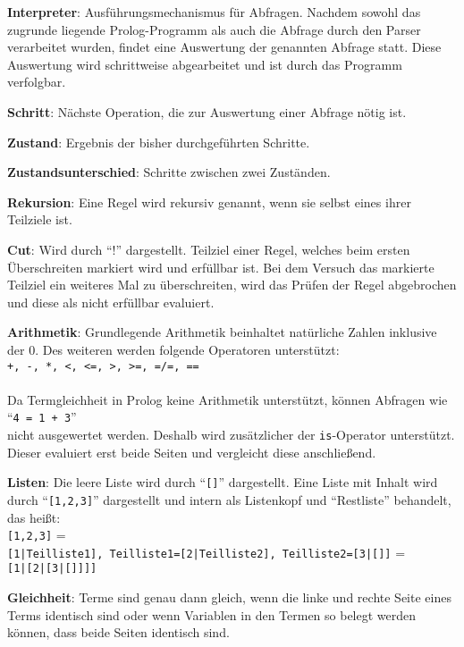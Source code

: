 \documentclass[parskip=full,11pt,twoside]{scrartcl}
\begin{document}
\textbf{Interpreter}:
Ausführungsmechanismus für Abfragen. Nachdem sowohl das zugrunde liegende Prolog-Programm als auch die Abfrage durch den Parser verarbeitet wurden, findet eine Auswertung der genannten Abfrage statt. Diese Auswertung wird schrittweise abgearbeitet und ist durch das Programm verfolgbar.

\textbf{Schritt}:
Nächste Operation, die zur Auswertung einer Abfrage nötig ist.

\textbf{Zustand}:
Ergebnis der bisher durchgeführten Schritte.

\textbf{Zustandsunterschied}:
Schritte zwischen zwei Zuständen.

\textbf{Rekursion}:
Eine Regel wird rekursiv genannt, wenn sie selbst eines ihrer Teilziele ist.

\textbf{Cut}:
Wird durch \enquote{!} dargestellt. Teilziel einer Regel, welches beim ersten Überschreiten markiert wird und erfüllbar ist. Bei dem Versuch das markierte Teilziel ein weiteres Mal zu überschreiten, wird das Prüfen der Regel abgebrochen und diese als nicht erfüllbar evaluiert.

\textbf{Arithmetik}:
Grundlegende Arithmetik beinhaltet natürliche Zahlen inklusive der 0. Des weiteren werden folgende Operatoren unterstützt:\\
\texttt{+, -, *, <, <=, >, >=, =/=, ==}\\
\\
Da Termgleichheit in Prolog keine Arithmetik unterstützt, können Abfragen wie\\
\enquote{\texttt{4 = 1 + 3}}\\
nicht ausgewertet werden. Deshalb wird zusätzlicher der \texttt{is}-Operator unterstützt. Dieser evaluiert erst beide Seiten und vergleicht diese anschließend.

\textbf{Listen}:
\label{list}
Die leere Liste wird durch \enquote{\texttt{[]}} dargestellt. Eine Liste mit Inhalt wird durch \enquote{\texttt{[1,2,3]}} dargestellt und intern als Listenkopf und \enquote{Restliste} behandelt, das heißt:\\
\texttt{[1,2,3]} =\\
\texttt{[1|Teilliste1], Teilliste1=[2|Teilliste2], Teilliste2=[3|[]]} =\\
\texttt{[1|[2|[3|[]]]]}

\textbf{Gleichheit}:
Terme sind genau dann gleich, wenn die linke und rechte Seite eines Terms identisch sind oder wenn Variablen in den Termen so belegt werden können, dass beide Seiten identisch sind.
\end{document}
